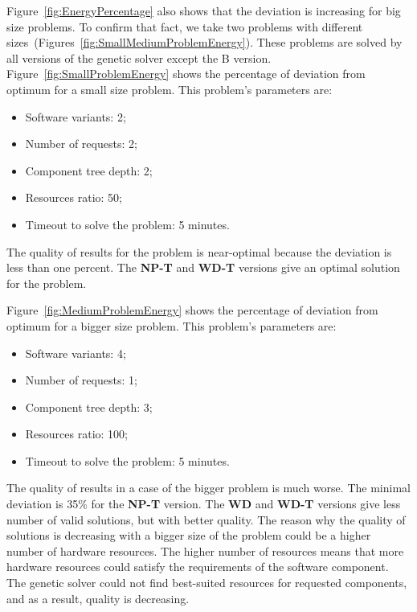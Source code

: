 Figure~\ref{fig:EnergyPercentage} also shows that the deviation is increasing for big size problems. To confirm that fact, we take two problems with different sizes~(Figures~\ref{fig:SmallMediumProblemEnergy}). These problems are solved by all versions of the genetic solver except the B version. Figure~\ref{fig:SmallProblemEnergy} shows the percentage of deviation from optimum for a small size problem. This problem's parameters are:
\begin{itemize}
	\item Software variants: 2;
	\item Number of requests: 2;
	\item Component tree depth: 2;
	\item Resources ratio: 50;
	\item Timeout to solve the problem: 5 minutes.
\end{itemize}

The quality of results for the problem is near-optimal because the deviation is less than one percent. The \textbf{NP-T} and \textbf{WD-T} versions give an optimal solution for the problem.

Figure~\ref{fig:MediumProblemEnergy} shows the percentage of deviation from optimum for a bigger size problem. This problem's parameters are:
\begin{itemize}
	\item Software variants: 4;
	\item Number of requests: 1;
	\item Component tree depth: 3;
	\item Resources ratio: 100;
	\item Timeout to solve the problem: 5 minutes.
\end{itemize}


The quality of results in a case of the bigger problem is much worse. The minimal deviation is 35\% for the \textbf{NP-T} version. The \textbf{WD} and \textbf{WD-T} versions give less number of valid solutions, but with better quality. The reason why the quality of solutions is decreasing with a bigger size of the problem could be a higher number of hardware resources. The higher number of resources means that more hardware resources could satisfy the requirements of the software component. The genetic solver could not find best-suited resources for requested components, and as a result, quality is decreasing. 



